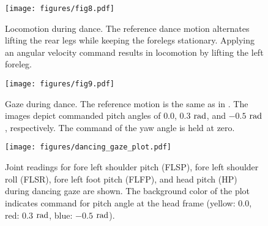 \begin{figure}[!t]
    \centering
    \texttt{[image: figures/fig8.pdf]}
    \caption{Locomotion during dance. The reference dance motion alternates lifting the rear legs while keeping the forelegs stationary. Applying an angular velocity command results in locomotion by lifting the left foreleg.}
    \label{fig:dancing_locomotion}
\end{figure}

\begin{figure}[!t]
    \vspace{-2ex}
    \centering
    \texttt{[image: figures/fig9.pdf]}
    \caption{Gaze during dance. The reference motion is the same as in . The images depict commanded pitch angles of $0.0$, $0.3$ $\rm{rad}$, and $-0.5$ $\rm{rad}$, respectively. The command of the yaw angle is held at zero.}
    \label{fig:dancing_gaze}
\end{figure}

\begin{figure}[!t]
    \centering
    \texttt{[image: figures/dancing\_gaze\_plot.pdf]}
    \caption{Joint readings for fore left shoulder pitch (FLSP), fore left shoulder roll (FLSR), fore left foot pitch (FLFP), and head pitch (HP) during dancing gaze are shown. The background color of the plot indicates command for pitch angle at the head frame (yellow: $0.0$, red: $0.3$ $\rm{rad}$, blue: $-0.5$ $\rm{rad}$).}
    \label{fig:dancing_gaze_plot}
    \vspace{-3ex}
\end{figure}

